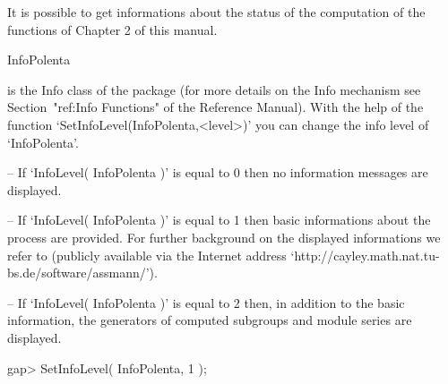 
It is possible to get informations about the status of the computation of the 
functions of Chapter 2 of this manual.


\> InfoPolenta
 
is the Info class of the {\Polenta} package (for more details on the Info mechanism see Section~"ref:Info Functions" of the 
{\GAP} Reference Manual). 
With the help of the function 
`SetInfoLevel(InfoPolenta,<level>)' you can change 
the info level of `InfoPolenta'. 
\beginlist
\item{--}
  If  `InfoLevel( InfoPolenta )' is equal to 0 
 then no information 
  messages are displayed. 
\item{--}
  If `InfoLevel( InfoPolenta )' is equal to 1 then basic informations
  about the process are provided. For further background on the displayed 
  informations we refer to  \cite{Assmann} (publicly available via the 
  Internet address `http://cayley.math.nat.tu-bs.de/software/assmann/').
\item{--}
  If `InfoLevel( InfoPolenta )' is equal to 2 then, in addition to the 
  basic information, the generators of computed subgroups and module series
  are displayed. 
\endlist



\beginexample
gap> SetInfoLevel( InfoPolenta, 1 );

